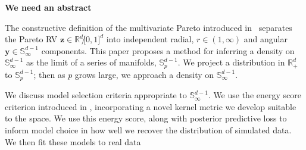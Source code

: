 {\bf We need an abstract}

The constructive definition of the multivariate Pareto introduced 
    in~\cite{ferreira2014} separates the Pareto RV $\bm{z}\in {\mathbb R}^d\not[0,1]^d$
    into independent radial,  $r \in (1,\infty)$ and angular 
    $\bm{y} \in {\mathbb S}_{\infty}^{d-1}$ components.
    This paper proposes a method for inferring a density on ${\mathbb S}_{\infty}^{d-1}$
    as the limit of a series of manifolds, ${\mathbb S}_{p}^{d-1}$.  We project a
    distribution in ${\mathbb R}_+^d$ to ${\mathbb S}_p^{d-1}$; then as $p$ grows
    large, we approach a density on ${\mathbb S}_{\infty}^{d-1}$.

We discuss model selection criteria appropriate to ${\mathbb S}_{\infty}^{d-1}$.  We
    use the energy score criterion introduced in \cite{gneiting2007}, incorporating a
    novel kernel metric we develop suitable to the space.  We use this energy score, along
    with posterior predictive loss to inform model choice in how well we recover the distribution of simulated data.  We then fit these models to real data

%